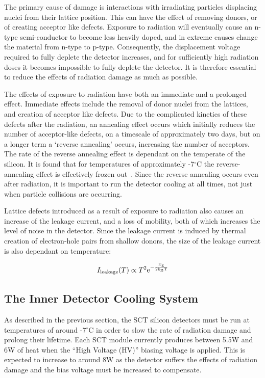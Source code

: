 The primary cause
of damage is interactions with irradiating particles displacing nuclei from
their lattice position. This can have the effect of removing donors, or of
creating acceptor like defects. Exposure to radiation will eventually cause an n-type
semi-conductor to become less heavily doped, and in extreme causes change the
material from n-type to p-type. Consequently, the displacement voltage required
to fully deplete the detector increases, and for sufficiently high radiation doses it
becomes impossible to fully deplete the detector. It is therefore essential to
reduce the effects of radiation damage as much as possible.

The effects of exposure to radiation have both
an immediate and a prolonged effect. Immediate effects include the removal of
donor nuclei from the lattices, and creation of acceptor like defects. Due to the
complicated kinetics of these defects after the radiation, an annealing effect
occurs which initially reduces the number of acceptor-like defects, on a timescale of
approximately two days, but on a longer term a `reverse annealing' occurs,
increasing the number of acceptors. The rate of the reverse annealing effect is dependant on the temperate of the
silicon. It is found that for temperatures of approximately -7$^{\circ}$C the
reverse-annealing effect is effectively frozen out~\cite{Lindstrom2001308}. Since the reverse annealing
occurs even after radiation, it is important to run the detector cooling at all
times, not just when particle collisions are occurring.

Lattice defects introduced as a result of exposure to radiation also causes an
increase of the leakage current, and
a loss of mobility,  both of which increases the level of noise in the detector. Since
the leakage current is induced by thermal creation of electron-hole pairs from
shallow donors, the size of the leakage current is also dependant on
temperature: 

\begin{equation}
I_{\rm{leakage}} (T) \propto T^{2} \rm{e}^{-\frac{E_{g}}{2k_{B}T}}
\end{equation}


\subsection{The Inner Detector Cooling System}
\label{sec:SCT-CoolingDesc}
As described in the
previous section, the SCT silicon detectors must be run
at temperatures of around -7$^{\circ}$C in order to slow the rate of radiation
damage and prolong their lifetime. 
Each SCT module currently produces between 5.5W and 6W of heat when the ``High
Voltage (HV)'' biasing voltage is applied. This is expected
to increase to around 8W as the detector suffers the effects of radiation
damage and the bias voltage must be increased to compensate. 

